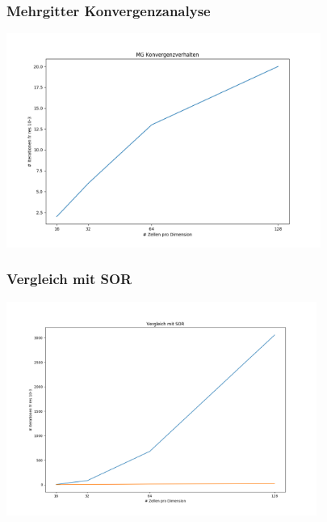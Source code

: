 \documentclass[]{beamer}
\begin{document}
\begin{frame}
  \frametitle{Mehrgitter Konvergenzanalyse}
  \begin{center}
    \includegraphics[width=0.9\linewidth, height=7cm]{mg_konvergenzverhalten.png}
  \end{center}
\end{frame}

\begin{frame}
  \frametitle{Vergleich mit SOR}
  \begin{center}
    \includegraphics[width=0.9\linewidth, height=7cm]{mg_vs_sor.png}
  \end{center}
\end{frame}
\end{document}
